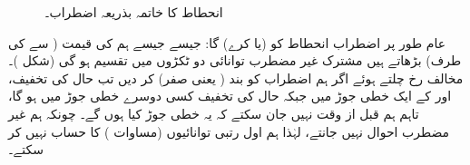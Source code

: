\begin{figure}
\centering
{}
\caption{انحطاط کا خاتمہ بذریعہ اضطراب۔}
\label{شکل_غیر_تابع_اضطراب_اختتام_انحطاط}
\end{figure}


عام طور پر اضطراب  انحطاط کو  (یا  کرے) گا: جیسے جیسے ہم  کی قیمت (  سے  کی طرف) بڑھاتے ہیں مشترک غیر مضطرب توانائی  دو ٹکڑوں میں تقسیم ہو گی (شکل )۔ مخالف رخ چلتے ہوئے اگر ہم اضطراب کو بند ( یعنی صفر) کر دیں تب  حال کی تخفیف،  اور  کے ایک خطی جوڑ میں جبکہ حال کی تخفیف کسی دوسرے  خطی جوڑ میں ہو گا، تاہم ہم قبل از وقت نہیں جان سکتے کہ یہ خطی جوڑ کیا ہوں گے۔ چونکہ ہم غیر مضطرب احوال نہیں جانتے، لہٰذا ہم اول رتبی توانائیوں (مساوات ) کا حساب نہیں کر سکتے۔ 

